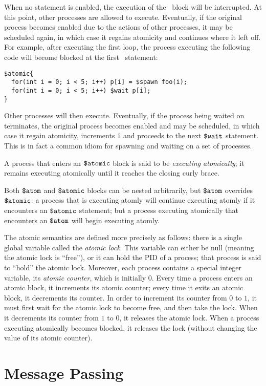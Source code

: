 When no statement is enabled, the execution of the \catomic\ block
will be interrupted.  At this point, other processes are allowed to
execute.  Eventually, if the original process becomes enabled due to
the actions of other processes, it may be scheduled again, in which
case it regains atomicity and continues where it left off.  For
example, after executing the first loop, the process executing the
following code will become blocked at the first \cwait\ statement:
 \begin{verbatim}  
$atomic{
  for(int i = 0; i < 5; i++) p[i] = $spawn foo(i);
  for(int i = 0; i < 5; i++) $wait p[i];
}
\end{verbatim}
Other processes will then execute. Eventually, if the process being
waited on terminates, the original process becomes enabled and may be
scheduled, in which case it regain atomicity, increments \texttt{i}
and proceeds to the next $\mbox{\texttt{\${}wait}}$ statement.  This is in fact a common
idiom for spawning and waiting on a set of processes.

A process that enters an $\mbox{\texttt{\${}atomic}}$ block is said to be
\emph{executing atomically}; it remains executing atomically until it
reaches the closing curly brace.

Both $\mbox{\texttt{\${}atom}}$ and $\mbox{\texttt{\${}atomic}}$ blocks can be nested arbitrarily, but
$\mbox{\texttt{\${}atom}}$ overrides $\mbox{\texttt{\${}atomic}}$: a process that is executing atomly will
continue executing atomly if it encounters an $\mbox{\texttt{\${}atomic}}$ statement;
but a process executing atomically that encounters an $\mbox{\texttt{\${}atom}}$ will
begin executing atomly.

The atomic semantics are defined more precisely as follows: there is a
single global variable called the \emph{atomic lock}. This variable
can either be null (meaning the atomic lock is ``free''), or it can
hold the PID of a process; that process is said to ``hold'' the atomic
lock.  Moreover, each process contains a special integer variable, its
\emph{atomic counter}, which is initially 0.  Every time a process
enters an atomic block, it increments its atomic counter; every time
it exits an atomic block, it decrements its counter.  In order to
increment its counter from $0$ to $1$, it must first wait for the
atomic lock to become free, and then take the lock.  When it
decrements its counter from $1$ to $0$, it releases the atomic lock.
When a process executing atomically becomes blocked, it releases the
lock (without changing the value of its atomic counter).


\section{Message Passing}

